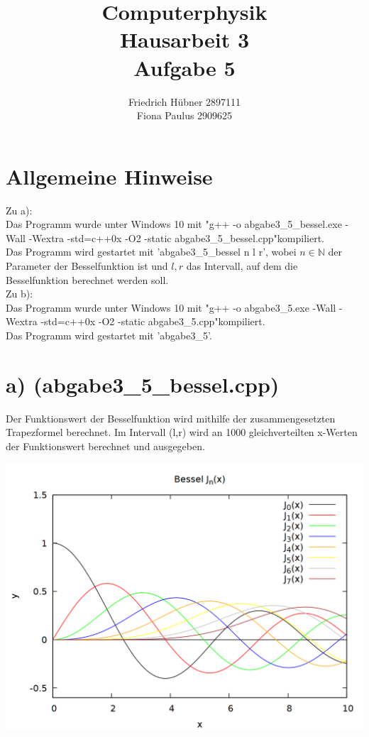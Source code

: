 \documentclass{scrartcl}
\author{Friedrich Hübner 2897111\\
Fiona Paulus 2909625}
\title{Computerphysik\\Hausarbeit 3\\Aufgabe 5}
\begin{document}
\maketitle
\newpage

\section*{Allgemeine Hinweise}
Zu a):\\
Das Programm wurde unter Windows 10 mit "g++ -o abgabe3\_5\_bessel.exe -Wall -Wextra -std=c++0x -O2 -static abgabe3\_5\_bessel.cpp"\;kompiliert.\\
Das Programm wird gestartet mit 'abgabe3\_5\_bessel n l r', wobei $n \in \mathbb{N}$ der Parameter der Besselfunktion ist und $l,r$ das Intervall, auf dem die Besselfunktion berechnet werden soll.\\

Zu b):\\
Das Programm wurde unter Windows 10 mit "g++ -o abgabe3\_5.exe -Wall -Wextra -std=c++0x -O2 -static abgabe3\_5.cpp"\;kompiliert.\\
Das Programm wird gestartet mit 'abgabe3\_5'. 

\section*{a) (abgabe3\_5\_bessel.cpp)}
Der Funktionswert der Besselfunktion wird mithilfe der zusammengesetzten Trapezformel berechnet. Im Intervall (l,r) wird an 1000 gleichverteilten x-Werten der Funktionswert berechnet und ausgegeben.

\begin{center}
\includegraphics[scale=0.3]{plot_bessel.png}
\end{center}
\end{document}

